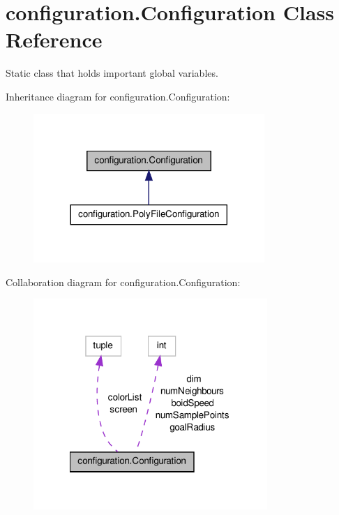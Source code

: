 \hypertarget{classconfiguration_1_1Configuration}{\section{configuration.\-Configuration Class Reference}
\label{classconfiguration_1_1Configuration}
}


Static class that holds important global variables.  




Inheritance diagram for configuration.\-Configuration\-:
\nopagebreak
\begin{figure}[H]
\begin{center}
\leavevmode
\includegraphics[width=248pt]{classconfiguration_1_1Configuration__inherit__graph}
\end{center}
\end{figure}


Collaboration diagram for configuration.\-Configuration\-:\nopagebreak
\begin{figure}[H]
\begin{center}
\leavevmode
\includegraphics[width=251pt]{classconfiguration_1_1Configuration__coll__graph}
\end{center}
\end{figure}
